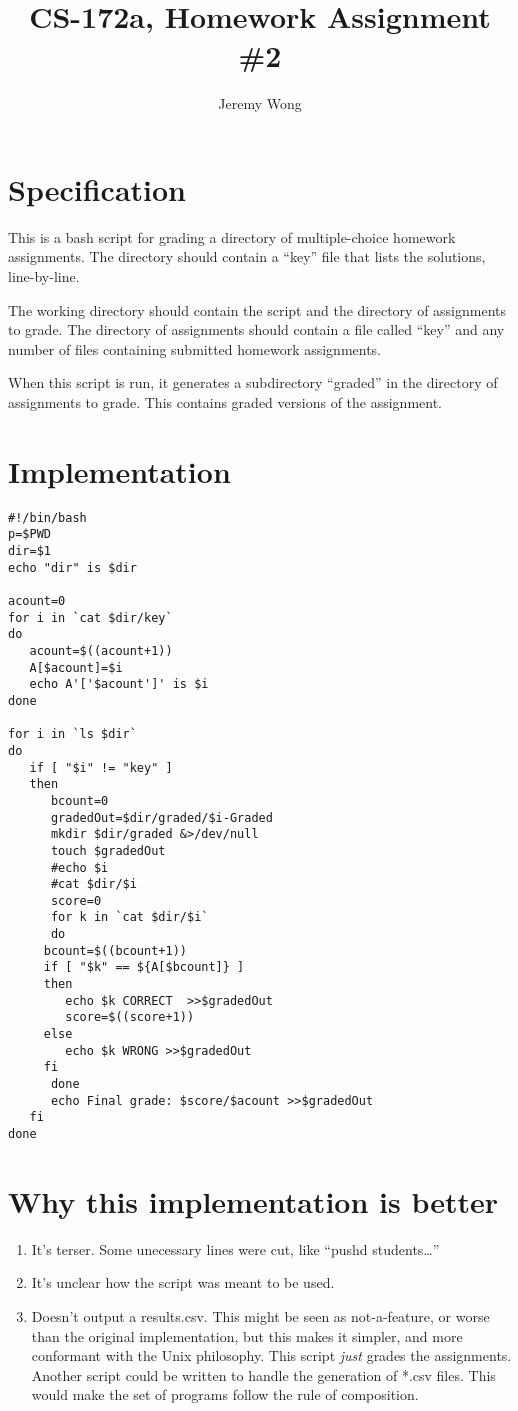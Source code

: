\documentclass[a4paper]{article}
\author{Jeremy Wong}
\title{CS-172a, Homework Assignment \#2}
\begin{document}
\maketitle
\section{Specification}
This is a bash script for grading a directory of multiple-choice homework assignments. The directory should contain a ``key'' file that lists the solutions, line-by-line.

The working directory should contain the script and the directory of assignments to grade. The directory of assignments should contain a file called ``key'' and any number of files containing submitted homework assignments.

When this script is run, it generates a subdirectory ``graded'' in the directory of assignments to grade. This contains graded versions of the assignment.
\section{Implementation}
\begin{verbatim}
#!/bin/bash
p=$PWD
dir=$1
echo "dir" is $dir

acount=0
for i in `cat $dir/key`
do
   acount=$((acount+1))
   A[$acount]=$i
   echo A'['$acount']' is $i
done

for i in `ls $dir`
do
   if [ "$i" != "key" ]
   then
      bcount=0
      gradedOut=$dir/graded/$i-Graded
      mkdir $dir/graded &>/dev/null
      touch $gradedOut 
      #echo $i
      #cat $dir/$i
      score=0
      for k in `cat $dir/$i`
      do
	 bcount=$((bcount+1))
	 if [ "$k" == ${A[$bcount]} ]
	 then 
	    echo $k CORRECT  >>$gradedOut
	    score=$((score+1))
	 else
	    echo $k WRONG >>$gradedOut
	 fi
      done
      echo Final grade: $score/$acount >>$gradedOut
   fi
done
\end{verbatim}

\section{Why this implementation is better}
\begin{enumerate}
   \item It's terser. Some unecessary lines were cut, like ``pushd students\ldots''
   \item It's unclear how the script was meant to be used. 
   \item Doesn't output a results.csv. This might be seen as not-a-feature, or worse than the original implementation, but this makes it simpler, and more conformant with the Unix philosophy. This script \textit{just} grades the assignments. Another script could be written to handle the generation of *.csv files. This would make the set of programs follow the rule of composition.

\end{enumerate}
\end{document}
